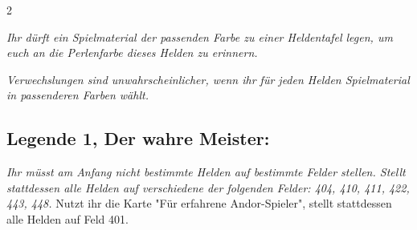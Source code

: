 \documentclass[10pt, a4paper, oneside]{book}
\newcommand{\fan}[1]{\textit{#1}}
\begin{document}
\begin{multicols*}{2}
\begin{bgcolor}
\fan{Ihr dürft ein Spielmaterial der passenden Farbe zu einer Heldentafel legen, um euch an die Perlenfarbe dieses Helden zu erinnern.}

\fan{Verwechslungen sind unwahrscheinlicher, wenn ihr für jeden Helden Spielmaterial in passenderen Farben wählt.}




\subsection{Legende 1, Der wahre Meister:}



\fan{Ihr müsst am Anfang nicht bestimmte Helden auf bestimmte Felder stellen. Stellt stattdessen alle Helden auf verschiedene der folgenden Felder: 404, 410, 411, 422, 443, 448.} Nutzt ihr die Karte "Für erfahrene Andor-Spieler", stellt stattdessen alle Helden auf Feld 401.
\supercite{DfL1:erfahren}






\end{bgcolor}









\end{multicols*}
\end{document}
